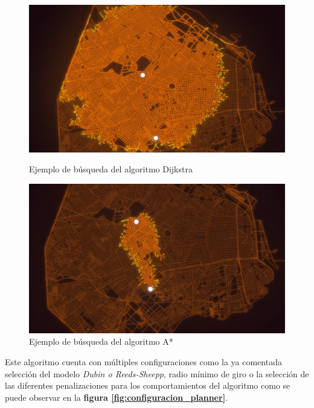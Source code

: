 \begin{figure}[htbp]
  \centering
  \begin{minipage}[b]{0.45\textwidth}
    \centering
    \includegraphics[width=\textwidth]{images/dijstra.png}
    \caption{Ejemplo de búsqueda del algoritmo Dijkstra}
    \label{fig:dijstra}
  \end{minipage}
  \hfill
  \begin{minipage}[b]{0.45\textwidth}
    \centering
    \includegraphics[width=\textwidth]{images/a_star.png}
    \caption{Ejemplo de búsqueda del algoritmo A*}
    \label{fig:a_star}
  \end{minipage}
\end{figure}
\newpage
Este algoritmo cuenta con múltiples configuraciones como la ya comentada selección del modelo \textit{Dubin o Reeds-Sheepp}, radio mínimo de giro 
o la selección de las diferentes penalizaciones para los comportamientos del algoritmo como se puede observar en la \textbf{figura \ref{fig:configuracion_planner}}.


